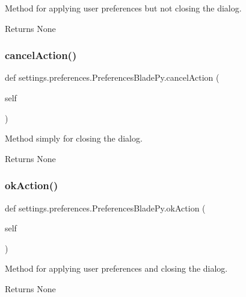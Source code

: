 Method for applying user preferences but not closing the dialog. 

\begin{DoxyReturn}{Returns}
None 
\end{DoxyReturn}
\hypertarget{a00102_af92de31fcc110a9892dc2914efb6b46f}{}\label{a00102_af92de31fcc110a9892dc2914efb6b46f} 
\subsubsection{\texorpdfstring{cancel\+Action()}{cancelAction()}}
{\footnotesize\ttfamily def settings.\+preferences.\+Preferences\+Blade\+Py.\+cancel\+Action (\begin{DoxyParamCaption}\item[{}]{self }\end{DoxyParamCaption})}



Method simply for closing the dialog. 

\begin{DoxyReturn}{Returns}
None 
\end{DoxyReturn}
\hypertarget{a00102_a7e99113696fefa62dfdeb2ba1279350c}{}\label{a00102_a7e99113696fefa62dfdeb2ba1279350c} 
\subsubsection{\texorpdfstring{ok\+Action()}{okAction()}}
{\footnotesize\ttfamily def settings.\+preferences.\+Preferences\+Blade\+Py.\+ok\+Action (\begin{DoxyParamCaption}\item[{}]{self }\end{DoxyParamCaption})}



Method for applying user preferences and closing the dialog. 

\begin{DoxyReturn}{Returns}
None 
\end{DoxyReturn}
\hypertarget{a00102_ab74be9049535f502252efb2df560ac8e}{}\label{a00102_ab74be9049535f502252efb2df560ac8e} 
